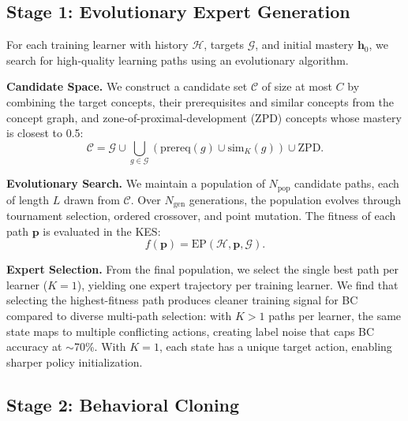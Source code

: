 \documentclass[sigconf,anonymous]{acmart}
\newcommand{\ep}{\mathrm{EP}}
\begin{document}
\subsection{Stage 1: Evolutionary Expert Generation}
\label{sec:method_stage1}

For each training learner with history $\mathcal{H}$, targets $\mathcal{G}$, and initial mastery $\mathbf{h}_0$, we search for high-quality learning paths using an evolutionary algorithm.

\textbf{Candidate Space.} We construct a candidate set $\mathcal{C}$ of size at most $C$ by combining the target concepts, their prerequisites and similar concepts from the concept graph, and zone-of-proximal-development (ZPD) concepts whose mastery is closest to 0.5:
\begin{equation}
    \mathcal{C} = \mathcal{G} \cup \bigcup_{g \in \mathcal{G}} \left(\text{prereq}(g) \cup \text{sim}_K(g)\right) \cup \text{ZPD}.
\end{equation}

\textbf{Evolutionary Search.} We maintain a population of $N_{\text{pop}}$ candidate paths, each of length $L$ drawn from $\mathcal{C}$. Over $N_{\text{gen}}$ generations, the population evolves through tournament selection, ordered crossover, and point mutation. The fitness of each path $\mathbf{p}$ is evaluated in the KES:
\begin{equation}
    f(\mathbf{p}) = \ep(\mathcal{H}, \mathbf{p}, \mathcal{G}).
\end{equation}

\textbf{Expert Selection.} From the final population, we select the single best path per learner ($K=1$), yielding one expert trajectory per training learner. We find that selecting the highest-fitness path produces cleaner training signal for BC compared to diverse multi-path selection: with $K>1$ paths per learner, the same state maps to multiple conflicting actions, creating label noise that caps BC accuracy at $\sim$70\%. With $K=1$, each state has a unique target action, enabling sharper policy initialization.

\subsection{Stage 2: Behavioral Cloning}
\end{document}
